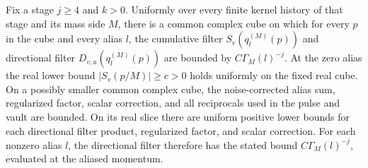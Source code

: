 \begin{lemma}
\label{lem:ex-lattice-train-component-bounds}
Fix a stage $j\geq4$ and $k>0$. Uniformly over every finite kernel history
of that stage and its mass side $M$, there is a common complex cube on which
for every $p$ in the cube and every alias $l$, the cumulative filter
$S_v(q_l^{(M)}(p))$ and directional filter $D_{v,a}(q_l^{(M)}(p))$ are bounded
by $C\Gamma_M(l)^{-j}$. At the zero alias the real lower bound
$|S_v(p/M)|\geq c>0$ holds uniformly on the fixed real cube. On a possibly
smaller common complex cube, the noise-corrected alias sum, regularized factor, scalar correction, and all
reciprocals used in the pulse and vault are bounded. On its real slice there
are uniform positive lower bounds for each directional filter product, regularized factor, and
scalar correction. For each nonzero alias $l$, the directional filter therefore has the
stated bound $C\Gamma_M(l)^{-j}$, evaluated at the aliased momentum.
\end{lemma}

